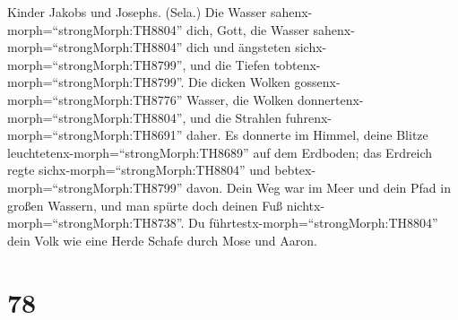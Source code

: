 Kinder Jakobs und Josephs. (Sela.)  Die Wasser
sahenx-morph=``strongMorph:TH8804'' dich, Gott, die Wasser
sahenx-morph=``strongMorph:TH8804'' dich und ängsteten
sichx-morph=``strongMorph:TH8799'', und die Tiefen
tobtenx-morph=``strongMorph:TH8799''.  Die dicken Wolken
gossenx-morph=``strongMorph:TH8776'' Wasser, die Wolken
donnertenx-morph=``strongMorph:TH8804'', und die Strahlen
fuhrenx-morph=``strongMorph:TH8691'' daher.  Es donnerte im
Himmel, deine Blitze leuchtetenx-morph=``strongMorph:TH8689'' auf dem
Erdboden; das Erdreich regte sichx-morph=``strongMorph:TH8804'' und
bebtex-morph=``strongMorph:TH8799'' davon.  Dein Weg war im
Meer und dein Pfad in großen Wassern, und man spürte doch deinen Fuß
nichtx-morph=``strongMorph:TH8738''.  Du
führtestx-morph=``strongMorph:TH8804'' dein Volk wie eine Herde Schafe
durch Mose und Aaron.

\hypertarget{section-77}{%
\section{78}\label{section-77}}

